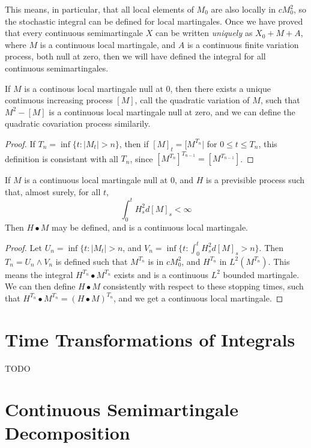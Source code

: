 This means, in particular, that all local elements of $M_0$ are also locally in $cM^2_0$, so the stochastic integral can be defined for local martingales. Once we have proved that every continuous semimartingale $X$ can be written {\it uniquely} as $X_0 + M + A$, where $M$ is a continuous local martingale, and $A$ is a continuous finite variation process, both null at zero, then we will have defined the integral for all continuous semimartingales.

\begin{theorem}
    If $M$ is a continous local martingale null at 0, then there exists a unique continuous increasing process $[M]$, call the quadratic variation of $M$, such that $M^2 - [M]$ is a continuous local martingale null at zero, and we can define the quadratic covariation process similarily.
\end{theorem}
\begin{proof}
    If $T_n = \inf \{ t : |M_t| > n \}$, then if $[M]_t = [M^{T_n}|$ for $0 \leq t \leq T_n$, this definition is consistant with all $T_n$, since $[M^{T_n}]^{T_{n-1}} = [M^{T_{n-1}}]$.
\end{proof}

\begin{theorem}
    If $M$ is a continuous local martingale null at 0, and $H$ is a previsible process such that, almost surely, for all $t$,
    \[ \int_0^t H_s^2 d[M]_s < \infty \]
    Then $H \bullet M$ may be defined, and is a continuous local martingale.
\end{theorem}
\begin{proof}
    Let $U_n = \inf \{ t : |M_t| > n$, and $V_n = \inf \{ t : \int_0^t H_s^2 d[M]_s > n \}$. Then $T_n = U_n \wedge V_n$ is defined such that $M^{T_n}$ is in $cM^2_0$, and $H^{T_n}$ in $L^2(M^{T_n})$. This means the integral $H^{T_n} \bullet M^{T_n}$ exists and is a continuous $L^2$ bounded martingale. We can then define $H \bullet M$ consistently with respect to these stopping times, such that $H^{T_n} \bullet M^{T_n} = (H \bullet M)^{T_n}$, and we get a continuous local martingale.
\end{proof}

\section{Time Transformations of Integrals}

TODO

\section{Continuous Semimartingale Decomposition}

